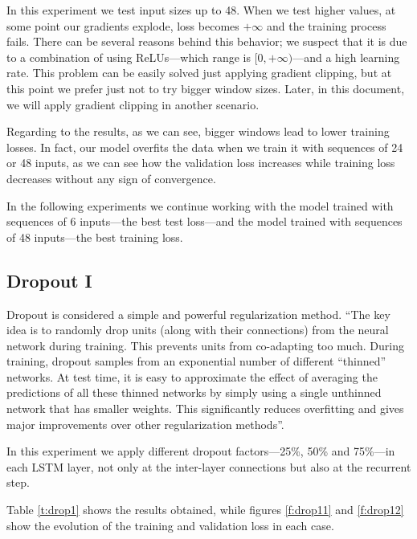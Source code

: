 \documentclass[]{article}
\begin{document}
In this experiment we test input sizes up to 48. When we test higher values, at some point our gradients explode, loss becomes $ +\infty $ and the training process fails. There can be several reasons behind this behavior; we suspect that it is due to a combination of using ReLUs---which range is $ [0, +\infty) $---and a high learning rate. This problem can be easily solved just applying gradient clipping, but at this point we prefer just not to try bigger window sizes. Later, in this document, we will apply gradient clipping in another scenario.

Regarding to the results, as we can see, bigger windows lead to lower training losses. In fact, our model overfits the data when we train it with sequences of 24 or 48 inputs, as we can see how the validation loss increases while training loss decreases without any sign of convergence.

In the following experiments we continue working with the model trained with sequences of 6 inputs---the best test loss---and the model trained with sequences of 48 inputs---the best training loss.

\subsection{Dropout I}

Dropout is considered a simple and powerful regularization method. \cite{srivastava2014dropout} ``The key idea is to randomly drop units (along with their connections) from the neural network during training. This prevents units from co-adapting too much. During training, dropout samples from an exponential number of different ``thinned'' networks. At test time, it is easy to approximate the effect of averaging the predictions of all these thinned networks by simply using a single unthinned network that has smaller weights. This significantly reduces overfitting and gives major improvements over other regularization methods''.

In this experiment we apply different dropout factors---25\%, 50\% and 75\%---in each LSTM layer, not only at the inter-layer connections but also at the recurrent step.

Table \ref{t:drop1} shows the results obtained, while figures \ref{f:drop11} and \ref{f:drop12} show the evolution of the training and validation loss in each case.
\end{document}
